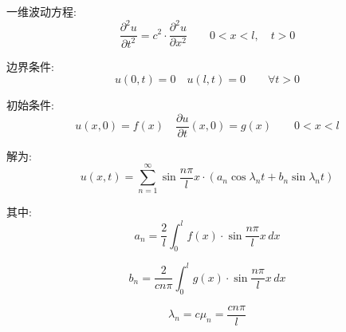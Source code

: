 \documentclass[12pt,a4paper]{article}
\numberwithin{subsection}{section}   %
\numberwithin{subsubsection}{subsection}
\theoremstyle{plain}
\theoremstyle{definition}
\theoremstyle{remark}
\theoremstyle{remark}
\begin{document}
	一维波动方程:
	\begin{equation}
		\frac{\partial^2 u}{\partial t^2} = c^2 \cdot \frac{\partial^2 u}{\partial x^2} \qquad 0 < x < l, \quad t > 0
	\end{equation}
	
	边界条件:
	\begin{equation}
		u(0, t) = 0 \quad u(l, t) = 0 \qquad \forall t > 0
	\end{equation}
	
	初始条件:
	\begin{equation}
		u(x, 0) = f(x) \quad \frac{\partial u}{\partial t}(x, 0) = g(x) \qquad 0 < x < l
	\end{equation}
	
	解为:
	\begin{equation}
		u(x, t) = \sum_{n=1}^{\infty} \sin \frac{n\pi}{l} x \cdot \left( a_n \cos \lambda_n t + b_n \sin \lambda_n t \right)
	\end{equation}
	
	其中:
	\begin{equation}
		a_n = \frac{2}{l} \int_0^l f(x) \cdot \sin \frac{n\pi}{l} x \, dx
	\end{equation}
	
	\begin{equation}
		b_n = \frac{2}{c n \pi} \int_0^l g(x) \cdot \sin \frac{n\pi}{l} x \, dx
	\end{equation}
	
	\begin{equation}
		\lambda_n = c \mu_n = \frac{c n \pi}{l}
	\end{equation}
	
\end{document}
